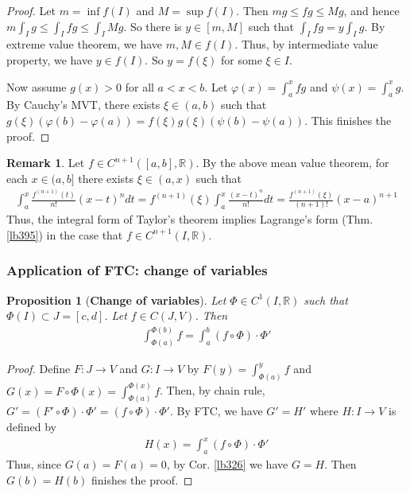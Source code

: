 \documentclass[12pt,b5paper,notitlepage]{article}
\theoremstyle{definition}
\newtheorem{rem}[df]{Remark}
\theoremstyle{plain}
\newtheorem{pp}[df]{Proposition}
\newcommand{\Rbb}{\mathbb R}
\newcommand{\dps}{\displaystyle}
\numberwithin{equation}{section}
\begin{document}
\begin{proof}
Let $m=\inf f(I)$ and $M=\sup f(I)$. Then $mg\leq fg\leq Mg$, and hence $m\int_Ig\leq \int_Ifg\leq \int_IMg$. So there is $y\in [m,M]$ such that $\int_Ifg=y\int_Ig$. By extreme value theorem, we have $m,M\in f(I)$. Thus, by intermediate value property, we have $y\in f(I)$. So $y=f(\xi)$ for some $\xi\in I$.

Now assume $g(x)>0$ for all $a<x<b$. Let $\varphi(x)=\int_a^xfg$ and $\psi(x)=\int_a^xg$. By Cauchy's MVT, there exists $\xi\in(a,b)$ such that $g(\xi)(\varphi(b)-\varphi(a))=f(\xi)g(\xi)(\psi(b)-\psi(a))$. This finishes the proof.
\end{proof}



\begin{rem}
Let $f\in C^{n+1}([a,b],\Rbb)$. By the above mean value theorem, for each $x\in(a,b]$ there exists $\xi\in(a,x)$ such that
\begin{align*}
\int_a^x\frac{f^{(n+1)}(t)}{n!}(x-t)^ndt=f^{(n+1)}(\xi)\int_a^x\frac{(x-t)^n}{n!}dt=\frac{f^{(n+1)}(\xi)}{(n+1)!}(x-a)^{n+1}
\end{align*}
Thus, the integral form of Taylor's theorem implies Lagrange's form (Thm. \ref{lb395}) in the case that $f\in C^{n+1}(I,\Rbb)$.
\end{rem}


\subsubsection{Application of FTC: change of variables}



\begin{pp}[\textbf{Change of variables}]\label{lb396}
Let $\Phi\in C^1(I,\Rbb)$ such that $\Phi(I)\subset J=[c,d]$. Let $f\in C(J,V)$. Then
\begin{align}
\int_{\Phi(a)}^{\Phi(b)} f=\int_a^b(f\circ\Phi)\cdot\Phi'
\end{align}
\end{pp}

\begin{proof}
Define $F:J\rightarrow V$ and $G:I\rightarrow V$ by $\dps F(y)=\int_{\Phi(a)}^y f$ and $\dps G(x)=F\circ\Phi(x)=\int_{\Phi(a)}^{\Phi(x)}f$. Then, by chain rule, $G'=(F'\circ\Phi)\cdot\Phi'=(f\circ\Phi)\cdot\Phi'$. By FTC, we have $G'=H'$ where $H:I\rightarrow V$ is defined by
\begin{align*}
H(x)=\int_a^x (f\circ\Phi)\cdot\Phi'
\end{align*}
Thus, since $G(a)=F(a)=0$, by Cor. \ref{lb326} we have $G=H$. Then $G(b)=H(b)$ finishes the proof.
\end{proof}
\end{document}
